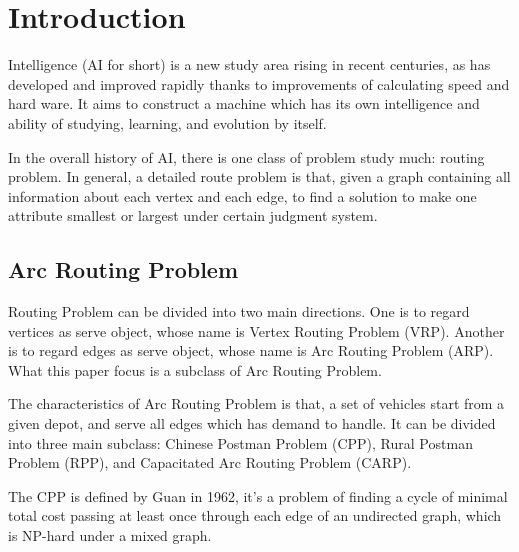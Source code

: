 \documentclass[journal]{IEEEtran}
\begin{document}
	
	
	\section{Introduction}
	 Intelligence (AI for short) is a new study area rising in recent centuries, as has developed and improved rapidly thanks to improvements of calculating speed and hard ware. It aims to construct a machine which has its own intelligence and ability of studying, learning, and evolution by itself.
	
	In the overall history of AI, there is one class of problem study much: routing problem. In general, a detailed route problem is that, given a graph containing all information about each vertex and each edge, to find a solution to make one attribute smallest or largest under certain judgment system.
	
	
	\subsection{Arc Routing Problem}
	Routing Problem can be divided into two main directions. One is to regard vertices as serve object, whose name is Vertex Routing Problem (VRP). Another is to regard edges as serve object, whose name is Arc Routing Problem (ARP). What this paper focus is a subclass of Arc Routing Problem.
	
	The characteristics of Arc Routing Problem is that, a set of vehicles start from a given depot, and serve all edges which has demand to handle. It can be divided into three main subclass: Chinese Postman Problem (CPP), Rural Postman Problem (RPP), and Capacitated Arc Routing Problem (CARP). \cite{inproceedings}
	
	The CPP is defined by Guan in 1962\cite{1962Graphic}, it's a problem of finding a cycle of minimal total cost passing at least once through each edge of an undirected graph, which is NP-hard under a mixed graph. 
	
\end{document}
